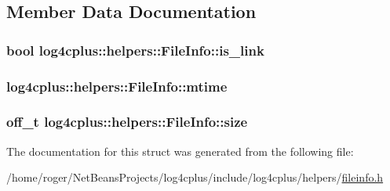 \subsection{Member Data Documentation}
\hypertarget{structlog4cplus_1_1helpers_1_1FileInfo_a814940b8abe01c1254f190131462fff2}{
\subsubsection[{is\-\_\-link}]{\setlength{\rightskip}{0pt plus 5cm}bool log4cplus\-::helpers\-::\-File\-Info\-::is\-\_\-link}}\label{structlog4cplus_1_1helpers_1_1FileInfo_a814940b8abe01c1254f190131462fff2}
\hypertarget{structlog4cplus_1_1helpers_1_1FileInfo_ab38d3edc9cf37c18859bd7accaaa3b15}{
\subsubsection[{mtime}]{ log4cplus\-::helpers\-::\-File\-Info\-::mtime}}\label{structlog4cplus_1_1helpers_1_1FileInfo_ab38d3edc9cf37c18859bd7accaaa3b15}
\hypertarget{structlog4cplus_1_1helpers_1_1FileInfo_a9e1c11126890a288319f8983d708fffc}{
\subsubsection[{size}]{\setlength{\rightskip}{0pt plus 5cm}off\-\_\-t log4cplus\-::helpers\-::\-File\-Info\-::size}}\label{structlog4cplus_1_1helpers_1_1FileInfo_a9e1c11126890a288319f8983d708fffc}


The documentation for this struct was generated from the following file\-:\begin{DoxyCompactItemize}
\item 
/home/roger/\-Net\-Beans\-Projects/log4cplus/include/log4cplus/helpers/\hyperlink{fileinfo_8h}{fileinfo.\-h}\end{DoxyCompactItemize}
